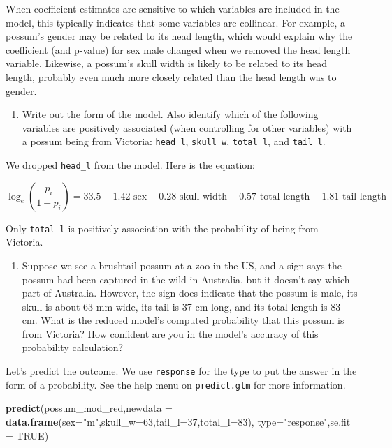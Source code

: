 \documentclass[
]{book}
\newenvironment{Shaded}{\begin{snugshade}}{\end{snugshade}}
\newcommand{\DataTypeTok}[1]{\textcolor[rgb]{0.13,0.29,0.53}{#1}}
\newcommand{\DecValTok}[1]{\textcolor[rgb]{0.00,0.00,0.81}{#1}}
\newcommand{\KeywordTok}[1]{\textcolor[rgb]{0.13,0.29,0.53}{\textbf{#1}}}
\newcommand{\NormalTok}[1]{#1}
\newcommand{\OtherTok}[1]{\textcolor[rgb]{0.56,0.35,0.01}{#1}}
\newcommand{\StringTok}[1]{\textcolor[rgb]{0.31,0.60,0.02}{#1}}
\providecommand{\tightlist}{%
  \setlength{\itemsep}{0pt}\setlength{\parskip}{0pt}}
\begin{document}
When coefficient estimates are sensitive to which variables are included in the model, this typically indicates that some variables are collinear. For example, a possum's gender may be related to its head length, which would explain why the coefficient (and p-value) for sex male changed when we removed the head length variable. Likewise, a possum's skull width is likely to be related to its head length, probably even much more closely related than the head length was to gender.

\begin{enumerate}
\def\labelenumi{\alph{enumi}.}
\setcounter{enumi}{5}
\tightlist
\item
  Write out the form of the model. Also identify which of the following variables are positively associated (when controlling for other variables) with a possum being from Victoria: \texttt{head\_l}, \texttt{skull\_w}, \texttt{total\_l}, and \texttt{tail\_l}.
\end{enumerate}

We dropped \texttt{head\_l} from the model. Here is the equation:

\[
\log_{e}\left( \frac{p_i}{1-p_i} \right)
    = 33.5 - 1.42 \text{ sex} -0.28 \text{ skull width}  + 0.57 \text{ total length} - 1.81 \text{ tail length}
\]

Only \texttt{total\_l} is positively association with the probability of being from Victoria.

\begin{enumerate}
\def\labelenumi{\alph{enumi}.}
\setcounter{enumi}{6}
\tightlist
\item
  Suppose we see a brushtail possum at a zoo in the US, and a sign says the possum had been captured in the wild in Australia, but it doesn't say which part of Australia. However, the sign does indicate that the possum is male, its skull is about 63 mm wide, its tail is 37 cm long, and its total length is 83 cm. What is the reduced model's computed probability that this possum is from Victoria? How confident are you in the model's accuracy of this probability calculation?
\end{enumerate}

Let's predict the outcome. We use \texttt{response} for the type to put the answer in the form of a probability. See the help menu on \texttt{predict.glm} for more information.

\begin{Shaded}
\begin{Highlighting}[]
\KeywordTok{predict}\NormalTok{(possum_mod_red,}\DataTypeTok{newdata =} \KeywordTok{data.frame}\NormalTok{(}\DataTypeTok{sex=}\StringTok{"m"}\NormalTok{,}\DataTypeTok{skull_w=}\DecValTok{63}\NormalTok{,}\DataTypeTok{tail_l=}\DecValTok{37}\NormalTok{,}\DataTypeTok{total_l=}\DecValTok{83}\NormalTok{),}
        \DataTypeTok{type=}\StringTok{"response"}\NormalTok{,}\DataTypeTok{se.fit =} \OtherTok{TRUE}\NormalTok{)}
\end{Highlighting}
\end{Shaded}
\end{document}
